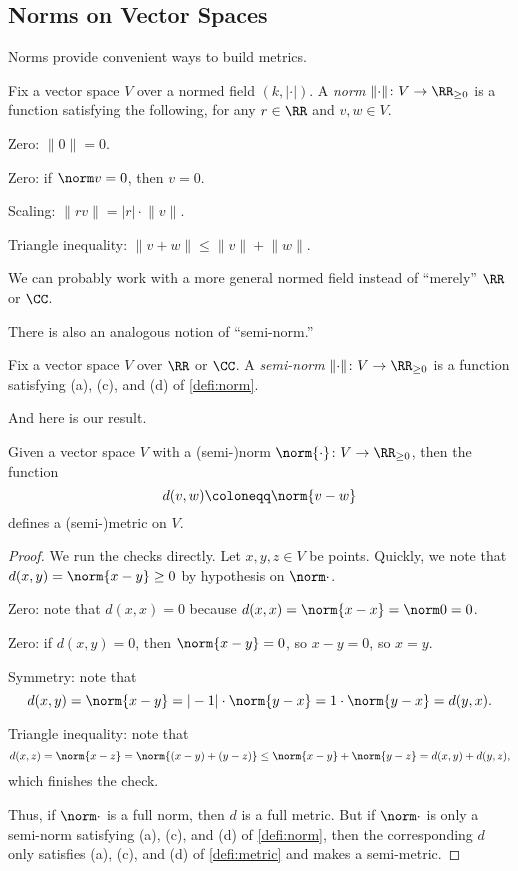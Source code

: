 \documentclass[../notes.tex]{subfiles}
\begin{document}
\subsection{Norms on Vector Spaces}
Norms provide convenient ways to build metrics.
\begin{definition}[Norm] \label{defi:norm}
	Fix a vector space $V$ over a normed field $(k,|\cdot|)$. A \textit{norm} $\lVert\cdot\rVert\colon V\to\RR_{\ge0}$ is a function satisfying the following, for any $r\in\RR$ and $v,w\in V$.
	\begin{listalph}
		\item Zero: $\lVert 0\rVert=0$.
		\item Zero: if $\norm v=0$, then $v=0$.
		\item Scaling: $\lVert rv\rVert=|r|\cdot\lVert v\rVert$.
		\item Triangle inequality: $\lVert v+w\rVert\le\lVert v\rVert+\lVert w\rVert$.
	\end{listalph}
\end{definition}
\begin{remark}
	We can probably work with a more general normed field instead of ``merely'' $\RR$ or $\CC$.
\end{remark}
There is also an analogous notion of ``semi-norm.''
\begin{definition}
	Fix a vector space $V$ over $\RR$ or $\CC$. A \textit{semi-norm} $\lVert\cdot\rVert\colon V\to\RR_{\ge0}$ is a function satisfying (a), (c), and (d) of \autoref{defi:norm}.
\end{definition}
And here is our result.
\begin{proposition} \label{prop:norm-to-metric}
	Given a vector space $V$ with a (semi-)norm $\norm{\cdot}\colon V\to\RR_{\ge0}$, then the function
	\[d(v,w)\coloneqq\norm{v-w}\]
	defines a (semi-)metric on $V$.
\end{proposition}
\begin{proof}
	We run the checks directly. Let $x,y,z\in V$ be points. Quickly, we note that $d(x,y)=\norm{x-y}\ge0$ by hypothesis on $\norm\cdot$.
	\begin{listalph}
		\item Zero: note that $d(x,x)=0$ because $d(x,x)=\norm{x-x}=\norm0=0$.
		\item Zero: if $d(x,y)=0$, then $\norm{x-y}=0$, so $x-y=0$, so $x=y$.
		\item Symmetry: note that
		\[d(x,y)=\norm{x-y}=|-1|\cdot\norm{y-x}=1\cdot\norm{y-x}=d(y,x).\]
		\item Triangle inequality: note that
		\[d(x,z)=\norm{x-z}=\norm{(x-y)+(y-z)}\le\norm{x-y}+\norm{y-z}=d(x,y)+d(y,z),\]
		which finishes the check.
	\end{listalph}
	Thus, if $\norm\cdot$ is a full norm, then $d$ is a full metric. But if $\norm\cdot$ is only a semi-norm satisfying (a), (c), and (d) of \autoref{defi:norm}, then the corresponding $d$ only satisfies (a), (c), and (d) of \autoref{defi:metric} and makes a semi-metric.
\end{proof}
\end{document}
